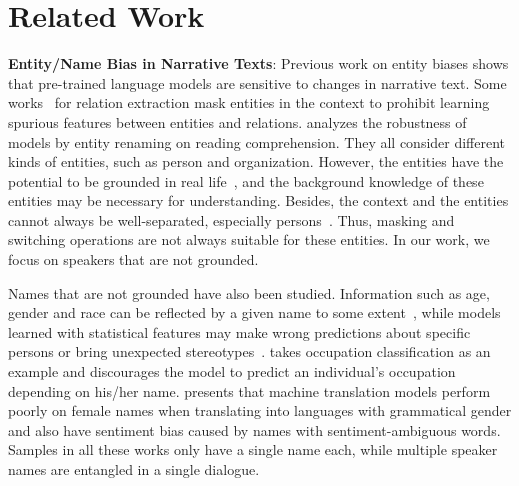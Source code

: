 \section{Related Work}

\textbf{Entity/Name Bias in Narrative Texts}: 
Previous work on entity biases shows that pre-trained language models are sensitive to changes in narrative text. Some works~\cite{zhang2018graph,zhang-etal-2017-position,wang-etal-2022-rely} for relation extraction mask entities in the context to prohibit learning spurious features between entities and relations. \citet{yan2022robustness} analyzes the robustness of models by entity renaming on reading comprehension. They all consider different kinds of entities, such as person and organization. However, the entities have the potential to be grounded in real life~\cite{smith2021hi}, and the background knowledge of these entities may be necessary for understanding. Besides, the context and the entities cannot always be well-separated, especially persons~\citet{yan2022robustness}. Thus, masking and switching operations are not always suitable for these entities.
In our work, we focus on speakers that are not grounded.  %

Names that are not grounded have also been studied. Information such as age, gender and race can be reflected by a given name to some extent~\cite{girma2020black}, while models learned with statistical features may make wrong predictions about specific persons or bring unexpected stereotypes~\cite{bertrand2004emily}. \citet{romanov2019s} takes occupation classification as an example and discourages the model to predict an individual's occupation depending on his/her name. \citet{wang2022measuring} presents that machine translation models perform poorly on female names when translating into languages with grammatical gender and also have sentiment bias caused by names with sentiment-ambiguous words. Samples in all these works only have a single name each, while multiple speaker names are entangled in a single dialogue.






